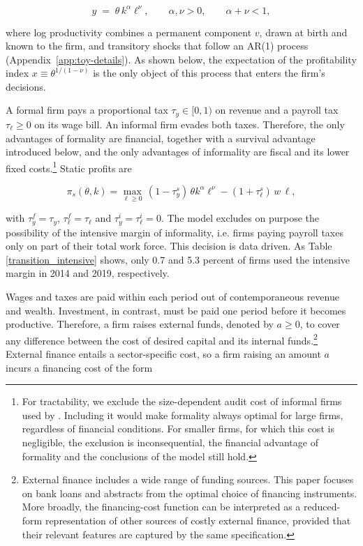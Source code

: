 \documentclass[12pt]{article}
\begin{document}
\begin{equation}
  y \;=\; \theta\, k^{\alpha}\ell^{\nu},
  \qquad \alpha,\nu>0,\qquad \alpha+\nu<1 ,
  \label{eq:toy-tech}
\end{equation}

where log productivity combines a permanent component $v$, drawn at birth and known to the firm, and transitory shocks that follow an AR(1) process (Appendix~\ref{app:toy-details}). As shown below, the expectation of the profitability index $x\equiv\theta^{1/(1-\nu)}$ is the only object of this process that enters the firm's decisions.

A formal firm pays a proportional tax $\tau_y\in[0,1)$ on revenue and a payroll tax $\tau_{\ell}\geq 0$ on its wage bill. An informal firm evades both taxes. Therefore, the only advantages of formality are financial, together with a survival advantage introduced below, and the only advantages of informality are fiscal and its lower fixed costs.\footnote{ For tractability, we exclude the size-dependent audit cost of informal firms used by \citet{ulyssea2018firms}. Including it would make formality always optimal for large firms, regardless of financial conditions. For smaller firms, for which this cost is negligible, the exclusion is inconsequential, the financial advantage of formality and the conclusions of the model still hold.} Static profits are

\begin{equation}
    \pi_{s}(\theta,k)=\max_{\ell\geq0}\,(1-\tau_{y}^{s})\,\theta k^{\alpha}\ell^{\nu}-(1+\tau_{\ell}^{s})\,w\,\ell ,
\end{equation}

with $\tau_{y}^{f}=\tau_{y}$, $\tau_{\ell}^{f}=\tau_{\ell}$ and $\tau_{y}^{i}=\tau_{\ell}^{i}=0$. The model excludes on purpose the possibility of the intensive margin of informality, i.e. firms paying payroll taxes only on part of their total work force. This decision is data driven. As Table \ref{transition_intensive} shows, only 0.7 and 5.3 percent of firms used the intensive margin in 2014 and 2019, respectively.

Wages and taxes are paid within each period out of contemporaneous revenue and wealth. Investment, in contrast, must be paid one period before it becomes productive. Therefore, a firm raises external funds, denoted by $a\geq0$, to cover any difference between the cost of desired capital and its internal funds.\footnote{External finance includes a wide range of funding sources. This paper focuses on bank loans and abstracts from the optimal choice of financing instruments. More broadly, the financing-cost function can be interpreted as a reduced-form representation of other sources of costly external finance, provided that their relevant features are captured by the same specification.} External finance entails a sector-specific cost, so a firm raising an amount $a$ incurs a financing cost of the form
\end{document}
